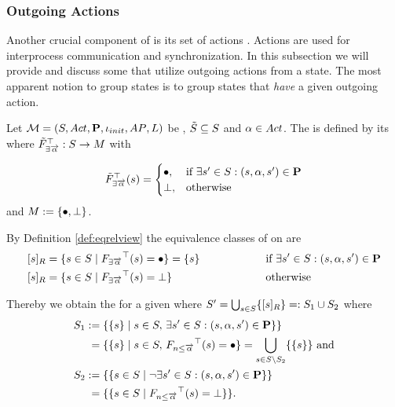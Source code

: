 \documentclass[preview]{standalone}
\begin{document}
\subsubsection{Outgoing Actions}
Another crucial component of \achgphN is its set of actions \actions. Actions are used for interprocess communication and synchronization. In this subsection we will provide and discuss some \viewsN that utilize outgoing actions from a state. 
The most apparent notion to group states is to group states that \emph{have} a given outgoing action.

\begin{definition}
	Let ${{{\mathcal{M}}}} = {{({S}, {Act}, {\textbf{P}}, {\iota_{init}}, {AP}, {L})}}$ be \achgphN, ${\tilde{{S}}} \subseteq {S}$ and ${\alpha} \in {Act}$. The \viewN \viewhasoutaction is defined by its \grpfctN \gfcthasoutaction where ${{\tilde{F}_{{\exists{\overrightarrow{\ensuremath{{\alpha}}}}}}}^{\top}} : {S} \to {\ensuremath{{M}}}$ with

	\[
	{{\tilde{F}_{{\exists{\overrightarrow{\ensuremath{{\alpha}}}}}}}^{\top}}({s}) =
	\begin{cases}
			{\bullet},				& \text{if } \exists {s}' \in {S}: ({s}, {\alpha}, {s}') \in {\ensuremath{{\textbf{P}}}} \\
			{\bot},     	& \text{otherwise}
		\end{cases}
	\]
	and ${{M}} := {\{{\bullet}, {\bot}\}}$. %
\end{definition}


\noindent By Definition \ref{def:eqrelview} the equivalence classes of \eqrelview on \states are 
\begin{alignat*}{3}
	\eqclassv &= \{\state \in \states \mid \gfcthasoutaction(\state) = \remelem\} = \{s\} \quad\quad\quad\quad\quad &&\text{if }\exists\state' \in \states : (\state, \action, \state') \in \trans \\
	\eqclassv &= \{\state \in \states \mid \gfcthasoutaction(\state) = \notppty\} \quad\quad\quad\quad\quad &&\text{otherwise}
\end{alignat*}

\noindent Thereby we obtain the \viewN \viewhasoutaction for a given \chgphN \chgph where ${S}' = \bigcup_{{s} \in {S}} \{{{[{s}]_{{R}}}}\} =: {S}_1 \cup {S}_2$ where
\begin{align*}
	\states_1 &:= \{\{\state\} \mid \state \in \states,\, \exists \state' \in \states: (\state, \action, \state') \in \trans\}\} \\
	&\;= \{\{\state\} \mid \state \in \states,\, \gfctminoutaction(\state) = \remelem\} = \nogroupstates \text{  and} \\
	\states_2 &:= \{\{\state \in \states \mid \lnot \exists \state' \in \states: (\state, \action, \state') \in \trans\}\} \\
	&\;= \{\{\state \in \states \mid \gfctminoutaction(\state) = \notppty\}\}.
\end{align*}
\end{document}
